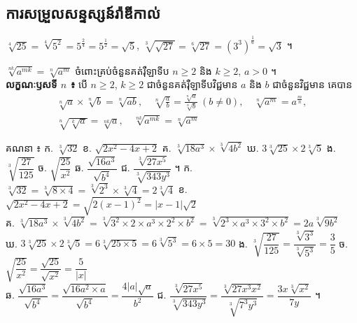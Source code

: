 \subsection{ការសម្រួលសន្ទស្សន៍រ៉ាឌីកាល់}
\begin{example}[ឧទាហរណ៍]
$\sqrt[4]{25} = \sqrt[4]{5^2} = 5^{\frac{2}{4}} = 5^{\frac{1}{2}} = \sqrt{5}$, \quad $\sqrt[3]{\sqrt{27}} = \sqrt[6]{27} = (3^3)^{\frac{1}{6}} = \sqrt{3}$ ។
\end{example}
\begin{formulaBox}[ជាទូទៅ]
$\sqrt[nk]{a^{mk}} = \sqrt[n]{a^m}$ ចំពោះគ្រប់ចំនួនគត់រ៉ឺឡាទីប $n \ge 2$ និង $k \ge 2$, $a > 0$ ។\\
\textbf{លក្ខណៈឫសទី $n$ ៖} បើ $n \ge 2$, $k \ge 2$ ជាចំនួនគត់រ៉ឺឡាទីបវិជ្ជមាន $a$ និង $b$ ជាចំនួនវិជ្ជមាន គេបាន
\[
\begin{gathered}
\sqrt[n]{a}\times\sqrt[n]{b} = \sqrt[n]{ab}, \quad \sqrt[n]{\frac{a}{b}} = \frac{\sqrt[n]{a}}{\sqrt[n]{b}}\ (b \ne 0), \quad \sqrt[n]{a^m} = a^{\frac{m}{n}},\\
\sqrt[n]{\sqrt[k]{a}} = \sqrt[nk]{a}, \quad \sqrt[nk]{a^{mk}} = \sqrt[n]{a^m}
\end{gathered}
\]
\end{formulaBox}

\begin{example}[លំហាត់គំរូ]
គណនា ៖ \quad ក. $\sqrt[3]{32}$ \quad ខ. $\sqrt{2x^2 - 4x + 2}$ \quad គ. $\sqrt[3]{18a^3}\times\sqrt[3]{4b^2}$ \quad ឃ. $3\sqrt[3]{25}\times 2\sqrt[3]{5}$ \quad ង. $\sqrt[3]{\dfrac{27}{125}}$ \quad ច. $\sqrt{\dfrac{25}{x^2}}$ \quad ឆ. $\dfrac{\sqrt{16a^3}}{\sqrt{b^4}}$ \quad ជ. $\dfrac{\sqrt[3]{27x^5}}{\sqrt[3]{343y^3}}$ ។
\ans
ក. $\sqrt[3]{32} = \sqrt[3]{8\times 4} = \sqrt[3]{2^3}\times\sqrt[3]{4} = 2\sqrt[3]{4}$ \quad ខ. $\sqrt{2x^2 - 4x + 2} = \sqrt{2(x-1)^2} = |x - 1|\sqrt{2}$\\
គ. $\sqrt[3]{18a^3}\times\sqrt[3]{4b^2} = \sqrt[3]{3^2\times 2\times a^3\times 2^2\times b^2} = \sqrt[3]{2^3\times a^3\times 3^2\times b^2} = 2a\sqrt[3]{9b^2}$\\
ឃ. $3\sqrt[3]{25}\times 2\sqrt[3]{5} = 6\sqrt[3]{25\times 5} = 6\sqrt[3]{5^3} = 6\times 5 = 30$ \quad ង. $\sqrt[3]{\dfrac{27}{125}} = \dfrac{\sqrt[3]{3^3}}{\sqrt[3]{5^3}} = \dfrac{3}{5}$ \quad ច. $\sqrt{\dfrac{25}{x^2}} = \dfrac{\sqrt{25}}{\sqrt{x^2}} = \dfrac{5}{|x|}$\\
ឆ. $\dfrac{\sqrt{16a^3}}{\sqrt{b^4}} = \dfrac{\sqrt{16a^2\times a}}{\sqrt{b^4}} = \dfrac{4|a|\sqrt{a}}{b^2}$ \quad ជ. $\dfrac{\sqrt[3]{27x^5}}{\sqrt[3]{343y^3}} = \dfrac{\sqrt[3]{27x^3x^2}}{\sqrt[3]{7^3y^3}} = \dfrac{3x\sqrt[3]{x^2}}{7y}$ ។
\end{example}

